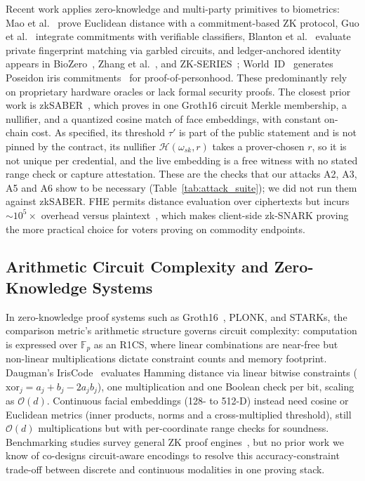 \documentclass[10pt,letterpaper,journal]{IEEEtran}
\begin{document}
Recent work applies zero-knowledge and multi-party primitives to biometrics: Mao et al.~\cite{Mao2023} prove Euclidean distance with a commitment-based ZK protocol, Guo et al.~\cite{Guo2024} integrate commitments with verifiable classifiers, Blanton et al.~\cite{Blanton2024} evaluate private fingerprint matching via garbled circuits, and ledger-anchored identity appears in BioZero~\cite{Lai2024}, Zhang et al.~\cite{Zhang2025}, and ZK-SERIES~\cite{ZKSeries2025}; World~ID~\cite{WorldID2024} generates Poseidon iris commitments~\cite{Grassi2021} for proof-of-personhood. These predominantly rely on proprietary hardware oracles or lack formal security proofs.
The closest prior work is zkSABER~\cite{zkSABER2025}, which proves in one Groth16 circuit Merkle membership, a nullifier, and a quantized cosine match of face embeddings, with constant on-chain cost. As specified, its threshold $\tau'$ is part of the public statement and is not pinned by the contract, its nullifier $\mathcal{H}(\omega_{sk}, r)$ takes a prover-chosen $r$, so it is not unique per credential, and the live embedding is a free witness with no stated range check or capture attestation. These are the checks that our attacks A2, A3, A5 and A6 show to be necessary (Table~\ref{tab:attack_suite}); we did not run them against zkSABER. FHE permits distance evaluation over ciphertexts but incurs $\sim 10^5\times$ overhead versus plaintext~\cite{Chialva2024,Karakosta2025,Moustaka2024}, which makes client-side zk-SNARK proving the more practical choice for voters proving on commodity endpoints.

\subsection{Arithmetic Circuit Complexity and Zero-Knowledge Systems}
\label{subsec:rel_circuit}
In zero-knowledge proof systems such as Groth16~\cite{Groth2016}, PLONK, and STARKs, the comparison metric's arithmetic structure governs circuit complexity: computation is expressed over $\mathbb{F}_p$ as an R1CS, where linear combinations are near-free but non-linear multiplications dictate constraint counts and memory footprint.
Daugman's IrisCode~\cite{Daugman2004,Daugman2016} evaluates Hamming distance via linear bitwise constraints ($\text{xor}_j = a_j + b_j - 2a_j b_j$), one multiplication and one Boolean check per bit, scaling as $\mathcal{O}(d)$. Continuous facial embeddings (128- to 512-D) instead need cosine or Euclidean metrics (inner products, norms and a cross-multiplied threshold), still $\mathcal{O}(d)$ multiplications but with per-coordinate range checks for soundness. Benchmarking studies survey general ZK proof engines~\cite{OudeRoelink2024}, but no prior work we know of co-designs circuit-aware encodings to resolve this accuracy-constraint trade-off between discrete and continuous modalities in one proving stack.
\end{document}
